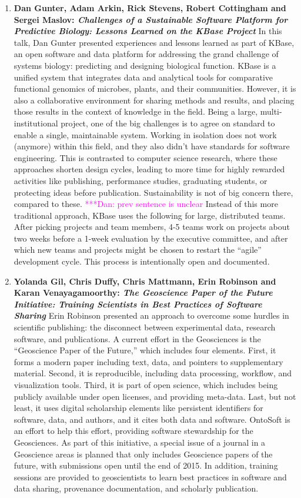 \documentclass[11pt, oneside]{amsart}
\newcommand{\katznote}[1]{ {\textcolor{magenta}    { ***Dan:      #1 }}}
\begin{document}
\begin{enumerate}
\item \textbf{Dan Gunter, Adam Arkin, Rick Stevens, Robert Cottingham and Sergei
Maslov: \textit{Challenges of a Sustainable Software Platform for Predictive
Biology: Lessons Learned on the KBase Project}} In this talk, Dan Gunter
presented experiences and lessons learned as part of KBase, an open software and
data platform for addressing the grand challenge of systems biology: predicting
and designing biological function. KBase is a unified system that integrates
data and analytical tools for comparative functional genomics of microbes,
plants, and their communities. However, it is also a collaborative environment
for sharing methods and results, and placing those results in the context of
knowledge in the field. Being a large, multi-institutional project, one of the
big challenges is to agree on standard to enable a single, maintainable system.
Working in isolation does not work (anymore) within this field, and they also
didn't have standards for software engineering. This is contrasted to computer
science research, where these approaches shorten design cycles, leading to more
time for highly rewarded activities like publishing, performance studies,
graduating students, or protecting ideas before publication. Sustainability is
not of big concern there, compared to these. \katznote{prev sentence is unclear}
Instead of this more traditional approach, KBase uses the following for large,
distributed teams. After picking projects and team members, 4-5 teams work on
projects about two weeks before a 1-week evaluation by the executive committee,
and after which new teams and projects might be chosen to restart the ``agile''
development cycle. This process is intentionally open and documented.

\item \textbf{Yolanda Gil, Chris Duffy, Chris Mattmann, Erin Robinson and Karan
Venayagamoorthy: \textit{The Geoscience Paper of the Future Initiative: Training
Scientists in Best Practices of Software Sharing}} Erin Robinson presented an
approach to overcome some hurdles in scientific publishing: the disconnect
between experimental data, research software, and publications. A current effort
in the Geosciences is the ``Geoscience Paper of the Future,'' which includes
four elements. First, it forms a modern paper including text, data, and pointers
to supplementary material. Second, it is reproducible, including data
processing, workflow, and visualization tools. Third, it is part of open
science, which includes being publicly available under open licenses, and
providing meta-data. Last, but not least, it uses digital scholarship elements
like persistent identifiers for software, data, and authors, and it cites both
data and software. OntoSoft is an effort to help this effort, providing software
stewardship for the Geosciences. As part of this initiative, a special issue of
a journal in a Geoscience areas is planned that only includes Geoscience papers
of the future, with submissions open until the end of 2015. In addition,
training sessions are provided to geoscientists to learn best practices in
software and data sharing, provenance documentation, and scholarly publication.


\end{enumerate}
\end{document}
